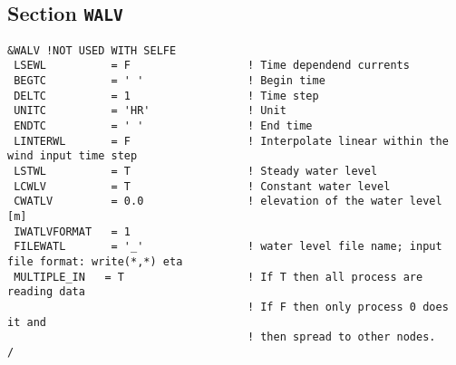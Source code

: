 \documentclass[12pt]{amsart}
\begin{document}
\subsection{Section {\tt WALV}}
\begin{verbatim}
&WALV !NOT USED WITH SELFE
 LSEWL          = F                  ! Time dependend currents
 BEGTC          = ' '                ! Begin time
 DELTC          = 1                  ! Time step
 UNITC          = 'HR'               ! Unit
 ENDTC          = ' '                ! End time
 LINTERWL       = F                  ! Interpolate linear within the wind input time step
 LSTWL          = T                  ! Steady water level
 LCWLV          = T                  ! Constant water level
 CWATLV         = 0.0                ! elevation of the water level [m]
 IWATLVFORMAT   = 1
 FILEWATL       = '_'                ! water level file name; input file format: write(*,*) eta
 MULTIPLE_IN   = T                   ! If T then all process are reading data
                                     ! If F then only process 0 does it and
                                     ! then spread to other nodes.
/
\end{verbatim}
\end{document}
